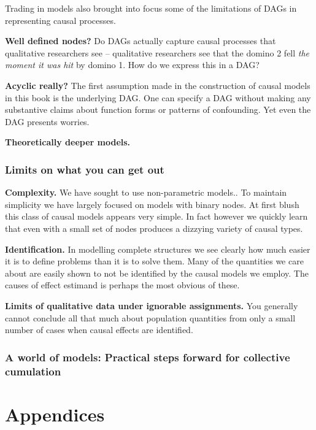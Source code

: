 \documentclass[
  12pt,
]{book}
\begin{document}
Trading in models also brought into focus some of the limitations of DAGs in representing causal processes.

\textbf{Well defined nodes?} Do DAGs actually capture causal processes that qualitative researchers see -- qualitative researchers see that the domino 2 fell \emph{the moment it was hit} by domino 1. How do we express this in a DAG?

\textbf{Acyclic really?} The first assumption made in the construction of causal models in this book is the underlying DAG. One can specify a DAG without making any substantive claims about function forms or patterns of confounding. Yet even the DAG presents worries.

\textbf{Theoretically deeper models.}

\hypertarget{limits-on-what-you-can-get-out}{%
\section{Limits on what you can get out}\label{limits-on-what-you-can-get-out}}

\textbf{Complexity.} We have sought to use non-parametric models.. To maintain simplicity we have largely focused on models with binary nodes. At first blush this class of causal models appears very simple. In fact however we quickly learn that even with a small set of nodes produces a dizzying variety of causal types.

\textbf{Identification.} In modelling complete structures we see clearly how much easier it is to define problems than it is to solve them. Many of the quantities we care about are easily shown to not be identified by the causal models we employ. The causes of effect estimand is perhaps the most obvious of these.

\textbf{Limits of qualitative data under ignorable assignments.} You generally cannot conclude all that much about population quantities from only a small number of cases when causal effects are identified.

\hypertarget{a-world-of-models-practical-steps-forward-for-collective-cumulation}{%
\section{A world of models: Practical steps forward for collective cumulation}\label{a-world-of-models-practical-steps-forward-for-collective-cumulation}}

\hypertarget{part-appendices}{%
\part{Appendices}\label{part-appendices}}
\end{document}
